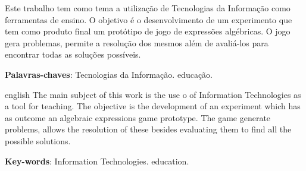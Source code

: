 
\setlength{\absparsep}{18pt} %
\begin{resumo}
 Este trabalho tem como tema a utilização de Tecnologias da Informação como ferramentas de ensino. O objetivo é o desenvolvimento de um  experimento que tem como produto final um protótipo de jogo de expressões algébricas. O jogo gera problemas, permite a resolução dos mesmos além de avaliá-los para encontrar todas as soluções possíveis.

 \textbf{Palavras-chaves}: Tecnologias da Informação. educação.
\end{resumo}

\begin{resumo}[Abstract]
 \begin{otherlanguage*}{english}
   The main subject of this work is the use o of Information Technologies as a tool for teaching. The objective is the development of an experiment which has as outcome an algebraic expressions game prototype. The game generate problems, allows the resolution of these besides evaluating them to find all the possible solutions.

   \vspace{\onelineskip}
 
   \noindent 
   \textbf{Key-words}: Information Technologies. education.
 \end{otherlanguage*}
\end{resumo}

